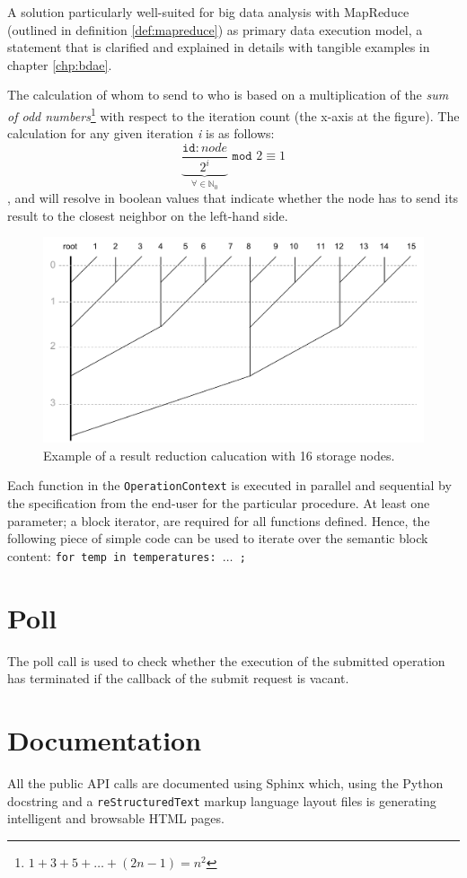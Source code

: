 A solution particularly well-suited for big data analysis with MapReduce (outlined in definition \ref{def:mapreduce}) as primary data execution model, a statement that is clarified and explained in details with tangible examples in chapter \ref{chp:bdae}.
\newline

The calculation of whom to send to who is based on a multiplication of the \textit{sum of odd numbers}\footnote{$1 + 3 + 5 + \ldots + (2n-1) = n^2$} with respect to the iteration count (the x-axis at the figure). The calculation for any given iteration \textit{i} is as follows:
\begin{equation}
\underbrace{\dfrac{\texttt{id}:node}{2^{i}}}_{\forall \in \mathbb{N}_0} \texttt{ mod } 2 \equiv 1
\end{equation}
, and will resolve in boolean values that indicate whether the node has to send its result to the closest neighbor on the left-hand side.
\newline

\begin{figure}
	\centering
	\includegraphics[scale=0.5]{pdf/reduction-tree.pdf}
	\caption[Result reduction calucation example]{Example of a result reduction calucation with 16 storage nodes. \label{fig:reduction-tree}}
\end{figure}	

Each function in the \texttt{OperationContext} is executed in parallel and sequential by the specification from the end-user for the particular procedure. At least one parameter; a block iterator, are required for all functions defined. Hence, the following piece of simple code can be used to iterate over the semantic block content: \texttt{for temp in temperatures: $\ldots$ ;}

\section{Poll}
The poll call is used to check whether the execution of the submitted operation has terminated if the callback of the submit request is vacant.

\section{Documentation}
All the public API calls are documented using Sphinx \cite{PageSphinx} which, using the Python docstring and a \texttt{reStructuredText} markup language layout files is generating intelligent and browsable HTML pages.
